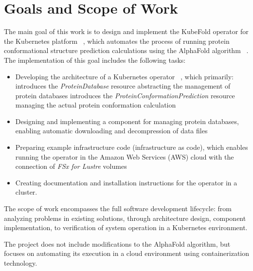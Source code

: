 \section{Goals and Scope of Work}

The main goal of this work is to design and implement the KubeFold operator for the Kubernetes platform ~\cite{kubernetes}, which automates the process of running protein conformational structure prediction calculations using the AlphaFold algorithm ~\cite{alphafold3}.
The implementation of this goal includes the following tasks:

\begin{itemize}
    \item Developing the architecture of a Kubernetes operator ~\cite{k8s_operators}, which primarily:
    \subitem introduces the \textit{ProteinDatabase} resource abstracting the management of protein databases
    \subitem introduces the \textit{ProteinConformationPrediction} resource managing the actual protein conformation calculation
    \item Designing and implementing a component for managing protein databases, enabling automatic downloading and decompression of data files
    \item Preparing example infrastructure code (infrastructure as code), which enables running the operator in the Amazon Web Services (AWS) cloud with the connection of \textit{FSx for Lustre} volumes
    \item Creating documentation and installation instructions for the operator in a cluster.
\end{itemize}

The scope of work encompasses the full software development lifecycle: from analyzing problems in existing solutions, through architecture design, component implementation, to verification of system operation in a Kubernetes environment.

The project does not include modifications to the AlphaFold algorithm, but focuses on automating its execution in a cloud environment using containerization technology.
